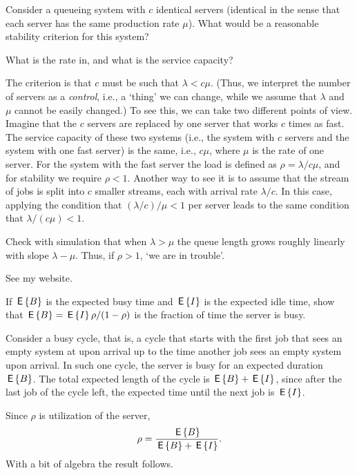 \begin{exercise}
  Consider a queueing system with $c$ identical servers (identical in
  the sense that each server has the same production rate $\mu$). What would be a reasonable stability criterion for this system? 
  \begin{hint}
What is the rate in, and what is the service capacity?
  \end{hint}
  \begin{solution}
    The criterion is that $c$ must be such that $\lambda <
    c\mu$.
    (Thus, we interpret the number of servers as a \emph{control},
    i.e., a `thing' we can change, while we assume that $\lambda$ and
    $\mu$ cannot be easily changed.) To see this, we can take two
  different points of view.  Imagine that the $c$ servers are replaced
  by one server that works $c$ times as fast. The service capacity of
  these two systems (i.e., the system with $c$ servers and the system
  with one fast server) is the same, i.e., $c\mu$, where $\mu$ is the
  rate of one server. For the system with the fast server the load is
  defined as $\rho =\lambda/c\mu$, and for stability we require
  $\rho<1$.  Another way to see it is to assume that the stream of
  jobs is split into $c$ smaller streams, each with arrival rate
  $\lambda/c$.  In this case, applying the condition that
  $(\lambda/c )/\mu<1$ per server leads to the same condition that
  $\lambda/(c\mu) < 1$.
  \end{solution}
\end{exercise}

\begin{exercise}
  Check with simulation that when $\lambda > \mu$ the queue length
  grows roughly linearly with slope $\lambda - \mu$.  Thus, if
  $\rho>1$, `we are in trouble'.
  \begin{solution}
    See my website. 
  \end{solution}
\end{exercise}


\begin{exercise}\label{ex:11}
  If $\,\mathsf{E}\left\{B\right\}$ is the expected busy time and $\,\mathsf{E}\left\{I\right\}$ is the expected idle
  time, show that $\,\mathsf{E}\left\{B\right\} = \,\mathsf{E}\left\{I\right\} \rho/(1-\rho) $
 is the fraction of time the  server is busy.
\begin{solution}
  Consider a busy cycle, that is, a cycle that starts with the first
  job that sees an empty system at upon arrival up to the time another
  job sees an empty system upon arrival. In such one cycle, the server
  is busy for an expected duration $\,\mathsf{E}\left\{B\right\}$. The total expected length
  of the cycle is $\,\mathsf{E}\left\{B\right\} + \,\mathsf{E}\left\{I\right\}$, since after the last job of the cycle
  left, the expected time until the next job is $\,\mathsf{E}\left\{I\right\}$.

  Since $\rho$ is utilization of the server,
  \begin{equation*}
\rho = \frac{\,\mathsf{E}\left\{B\right\}}{\,\mathsf{E}\left\{B\right\} + \,\mathsf{E}\left\{I\right\}}.
  \end{equation*}
  With a bit of algebra the result follows.
\end{solution}
\end{exercise}


